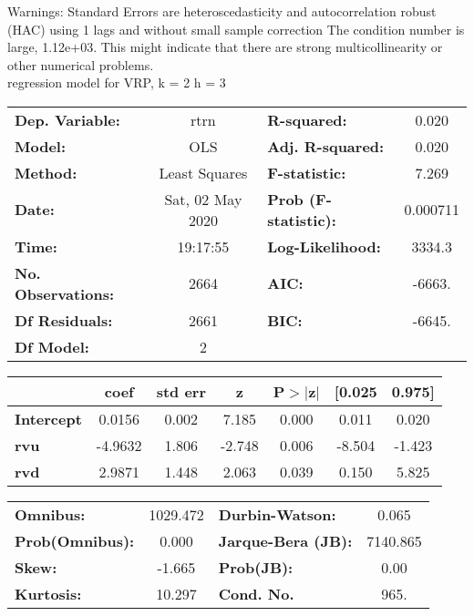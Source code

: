 Warnings: \newline
 [1] Standard Errors are heteroscedasticity and autocorrelation robust (HAC) using 1 lags and without small sample correction \newline
 [2] The condition number is large, 1.12e+03. This might indicate that there are \newline
 strong multicollinearity or other numerical problems.\\ 

regression model for VRP, k = 2 h = 3\begin{center}
\begin{tabular}{lclc}
\toprule
\textbf{Dep. Variable:}    &       rtrn       & \textbf{  R-squared:         } &     0.020   \\
\textbf{Model:}            &       OLS        & \textbf{  Adj. R-squared:    } &     0.020   \\
\textbf{Method:}           &  Least Squares   & \textbf{  F-statistic:       } &     7.269   \\
\textbf{Date:}             & Sat, 02 May 2020 & \textbf{  Prob (F-statistic):} &  0.000711   \\
\textbf{Time:}             &     19:17:55     & \textbf{  Log-Likelihood:    } &    3334.3   \\
\textbf{No. Observations:} &        2664      & \textbf{  AIC:               } &    -6663.   \\
\textbf{Df Residuals:}     &        2661      & \textbf{  BIC:               } &    -6645.   \\
\textbf{Df Model:}         &           2      & \textbf{                     } &             \\
\bottomrule
\end{tabular}
\begin{tabular}{lcccccc}
                   & \textbf{coef} & \textbf{std err} & \textbf{z} & \textbf{P$> |$z$|$} & \textbf{[0.025} & \textbf{0.975]}  \\
\midrule
\textbf{Intercept} &       0.0156  &        0.002     &     7.185  &         0.000        &        0.011    &        0.020     \\
\textbf{rvu}       &      -4.9632  &        1.806     &    -2.748  &         0.006        &       -8.504    &       -1.423     \\
\textbf{rvd}       &       2.9871  &        1.448     &     2.063  &         0.039        &        0.150    &        5.825     \\
\bottomrule
\end{tabular}
\begin{tabular}{lclc}
\textbf{Omnibus:}       & 1029.472 & \textbf{  Durbin-Watson:     } &    0.065  \\
\textbf{Prob(Omnibus):} &   0.000  & \textbf{  Jarque-Bera (JB):  } & 7140.865  \\
\textbf{Skew:}          &  -1.665  & \textbf{  Prob(JB):          } &     0.00  \\
\textbf{Kurtosis:}      &  10.297  & \textbf{  Cond. No.          } &     965.  \\
\bottomrule
\end{tabular}
\end{center}

